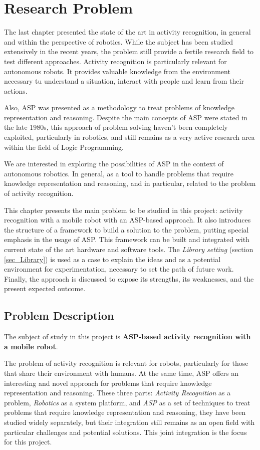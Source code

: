 \chapter{Research Problem}

The last chapter presented the state of the art in activity recognition, in general and within the perspective of robotics.
While the subject has been studied extensively in the recent years, the problem still provide a fertile research field to test different approaches.
Activity recognition is particularly relevant for autonomous robots.
It provides valuable knowledge from the environment necessary tu understand a situation, interact with people and learn from their actions. 

Also, ASP was presented as a methodology to treat problems of knowledge representation and reasoning.
Despite the main concepts of ASP were stated in the late 1980s, this approach of problem solving haven't been completely exploited, particularly in robotics, and still remains as a very active research area within the field of Logic Programming.

We are interested in exploring the possibilities of ASP in the context of autonomous robotics.
In general, as a tool to handle problems that require knowledge representation and reasoning, and in particular, related to the problem of activity recognition.

This chapter presents the main problem to be studied in this project: activity recognition with a mobile robot with an ASP-based approach.
It also introduces the structure of a framework to build a solution to the problem, putting special emphasis in the usage of ASP.
This framework can be built and integrated with current state of the art hardware and software tools. 
The \textit{Library setting} (section \ref{sec_Library}) is used as a case to explain the ideas and as a potential environment for experimentation, necessary to set the path of future work.
Finally, the approach is discussed to expose its strengths, its weaknesses, and the present expected outcome.


\section{Problem Description} \label{sec_problem}

The subject of study in this project is \textbf{ASP-based activity recognition with a mobile robot}.

The problem of activity recognition is relevant for robots, particularly for those that share their environment with humans.
At the same time, ASP offers an interesting and novel approach for problems that require knowledge representation and reasoning.
These three parts: \textit{Activity Recognition} as a problem, \textit{Robotics} as a system platform, and \textit{ASP} as a set of techniques to treat problems that require knowledge representation and reasoning, they have been studied widely separately, but their integration still remains as an open field with particular challenges and potential solutions. 
This joint integration is the focus for this project.

